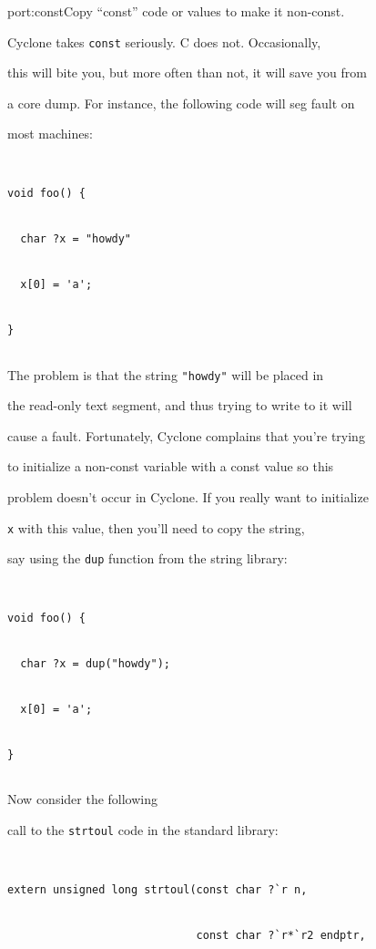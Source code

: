 \begin{porta}{port:const}{Copy ``const'' code or values to make it non-const.}  





Cyclone takes \texttt{const} seriously.  C does not.  Occasionally,


this will bite you, but more often than not, it will save you from


a core dump.  For instance, the following code will seg fault on


most machines:


\begin{verbatim}


void foo() {


  char ?x = "howdy"


  x[0] = 'a';


}


\end{verbatim}


The problem is that the string \texttt{"howdy"} will be placed in


the read-only text segment, and thus trying to write to it will


cause a fault.  Fortunately, Cyclone complains that you're trying


to initialize a non-const variable with a const value so this


problem doesn't occur in Cyclone.  If you really want to initialize


\texttt{x} with this value, then you'll need to copy the string,


say using the \texttt{dup} function from the string library:


\begin{verbatim}


void foo() {


  char ?x = dup("howdy");


  x[0] = 'a';


}


\end{verbatim}


Now consider the following


call to the \texttt{strtoul} code in the standard library:


\begin{verbatim}


extern unsigned long strtoul(const char ?`r n, 


                             const char ?`r*`r2 endptr,



\end{verbatim}
\end{porta}
